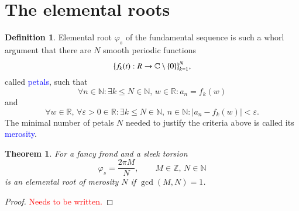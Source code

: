\documentclass{article}
\newcommand{\red}[1]{\textcolor{red}{#1}}
\newcommand{\blue}[1]{\textcolor{blue}{#1}}
\theoremstyle{plain}
\newtheorem{theorem}{Theorem}[section]
\theoremstyle{definition}
\newtheorem{definition}{Definition}[section]
\newcommand{\cmz}{\mathbb C \setminus \{0\} }
\begin{document}
\section{The elemental roots}
\begin{definition}
Elemental root $\varphi_s$ of the fundamental sequence is such a whorl argument that there are $N$ smooth periodic functions 
$$ \big\{f_k(t): \mathbb \mathbb R \rightarrow \cmz\big\}_{k=1}^N 
,$$ called \blue{petals}, such that $$
\forall n \in \mathbb N: \exists k\le N \in \mathbb N,\,w \in \mathbb R: a_n = f_k(w) 
$$ and $$
\forall w \in \mathbb R,\, \forall \varepsilon >0  \in \mathbb R: \exists k\le N \in \mathbb N,\, n \in \mathbb N: |a_n - f_k(w)|<\varepsilon
.$$
The minimal number of petals $N$ needed to justify the criteria above is called its \blue{merosity}.  	
\end{definition}

\begin{theorem}
For a fancy frond and a sleek torsion $$\varphi_s = \frac{2\pi M}N, \qquad M \in \mathbb Z,\, N \in\mathbb N $$ is an elemental root of merosity $N$ if $\gcd(M,N)=1$.
\end{theorem}
\begin{proof}
\red{Needs to be written.}
\end{proof}
\end{document}
